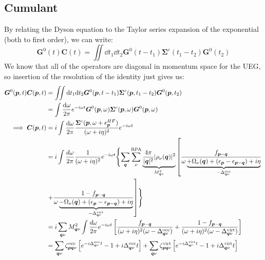 \subsection{Cumulant}
 By relating the Dyson equation to the Taylor series expansion of the exponential (both to first order), we can write:
\begin{equation}
    \bm{G}^0(t) \bm{C}(t) = \iint \dd t_1 \dd t_2 \bm{G}^0(t-t_1) \bm{\Sigma}^c(t_1 - t_2) \bm{G}^0(t_2)
\end{equation}
We know that all of the operators are diagonal in momentum space for the UEG, so insertion of the resolution of the identity just gives us:
\begin{align}
\bm{G}^{0}(\bm{p}, t) \bm{C}(\bm{p}, t) &= {\iint \dd t_1 \dd t_2 \bm{G}^{0}(\bm{p}, t-t_1) \bm{\Sigma}^c(\bm{p}, t_1 - t_2) \bm{G}^{0}(\bm{p}, t_2)} \\
&= \int \frac{\dd \omega}{2\pi} e^{-i\omega t} \bm{G}^{0}(\bm{p},\omega)\bm{\Sigma}^c(\bm{p},\omega)\bm{G}^{0}(\bm{p},\omega) \\
\implies \bm{C}(\bm{p}, t) &= i \int \frac{\dd \omega}{2\pi} \frac{ \bm{\Sigma}^c(\bm{p},\omega+\epsilon_{\bm{p}}^{HF})}{(\omega + i \eta)^2} e^{-i \omega t} \\
&= i \int \frac{d\omega}{2\pi} \frac{1}{(\omega + i \eta)^2} e^{-i \omega t} \Biggl\{\sum_{\bm{q}}\sum_{\nu }^{\text{RPA}} \underbrace{\frac{4\pi}{|\bm{q}|^2} |\rho_\nu(\bm{q})|^2 }_{M_{\bm{q}\nu}^2}\left[ \frac{f_{\bm{p} - \bm{q}}}{\omega \underbrace{+ \Omega_\nu(\bm{q}) + (\epsilon_{\bm{p}} - \epsilon_{\bm{p} - \bm{q}}) + i\eta}_{-\Delta ^{\text{occ}}_{\bm{q}\nu}}}\right. \\
& \left. + \frac{1 - f_{\bm{p} - \bm{q}}}{\omega \underbrace{- \Omega_\nu(\bm{q})+ (\epsilon_{\bm{p}} - \epsilon_{\bm{p} - \bm{q}} )+ i\eta}_{-\Delta^{\text{virt}}_{\bm{q}\nu}}} \right]\Biggr\} \notag \\
&= i \sum_{\bm{q}\nu} M_{\bm{q}\nu}^2 \int \frac{d\omega}{2\pi} e^{-i \omega t} \left[\frac{f_{\bm{p} - \bm{q}}}{(\omega + i \eta)^2(\omega - \Delta^{\text{occ}}_{\bm{q}\nu})} + \frac{1 - f_{\bm{p} - \bm{q}}}{(\omega + i \eta)^2(\omega - \Delta^{\text{virt}}_{\bm{q}\nu})}\right] \\
&= \sum_{\bm{q}\nu} \zeta_{\bm{p}\bm{q}\nu}^{\text{occ}} \left[e^{-i \Delta^{\text{occ}}_{\bm{q}\nu} t} - 1 + i \Delta^{\text{occ}}_{\bm{q}\nu} t\right] + \sum_{\bm{q}\nu} \zeta_{\bm{p}\bm{q}\nu}^{\text{virt}} \left[e^{-i \Delta^{\text{virt}}_{\bm{q}\nu} t} - 1 + i \Delta^{\text{virt}}_{\bm{q}\nu} t\right]
\end{align}
